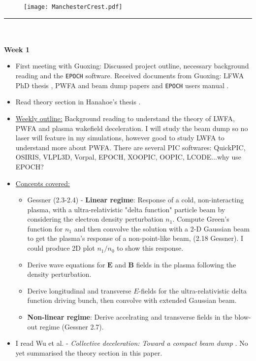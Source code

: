 \documentclass[%
onecolumn, notitlepage,
 amsmath,amssymb,
 aps,
]{article}
\renewcommand{\vec}[1]{\mathbf{#1}}
\renewcommand{\vec}[1]{\mathbf{#1}}
\begin{document}
\begin{figure}[h]
\vspace{-95pt}\hspace{0.85\textwidth}
\texttt{[image: ManchesterCrest.pdf]} 
\end{figure}\vspace{-35pt}
\noindent\rule{0.72\textwidth}{0.4pt}\\
\\
\noindent \textbf{Week 1}
\begin{itemize}
\item[\textcolor{MancPurple}{\textbullet}]  First meeting with Guoxing: Discussed project outline, necessary background reading and the \texttt{EPOCH} software. Received documents from Guoxing: LFWA PhD thesis \citep{Chou2016}, PWFA and beam dump papers \citep{Bonatto2015,Bonatto2016,Lu2005,Wu2010,Chou2016a,Hanahoe2017} and  \texttt{EPOCH} users manual \citep{Bennett2015}.
\item[\textcolor{MancPurple}{\textbullet}] Read theory section in Hanahoe's thesis \citep{Hanahoe2017}.
\item[\textcolor{MancPurple}{\textbullet}] \underline{Weekly outline:} Background reading to understand the theory of LWFA, PWFA and plasma wakefield deceleration. I will study the beam dump so no laser will feature in my simulations, however good to study LWFA to understand more about PWFA. There are several PIC softwares: QuickPIC, OSIRIS, VLPL3D, Vorpal, EPOCH, XOOPIC, OOPIC, LCODE...why use EPOCH?
\item[\textcolor{MancPurple}{\textbullet}] \underline{Concepts covered:}
 \begin{itemize}
\item[\textcolor{MancPurple}{\textopenbullet}] Gessner (2.3-2.4) - \textbf{Linear regime}: Response of a cold, non-interacting plasma, with a ultra-relativistic "delta function" particle beam by considering the electron density perturbation $n_1$. Compute Green's function for $n_1$ and then convolve the solution with a 2-D Gaussian beam to get the plasma's response of a non-point-like beam, (2.18 Gessner). I could produce 2D plot $n_1/n_0$ to show this response.
\item[\textcolor{MancPurple}{\textopenbullet}] Derive wave equations for $\vec{E}$ and $\vec{B}$ fields in the plasma following the density perturbation.
\item[\textcolor{MancPurple}{\textopenbullet}] Derive longitudinal and transverse $E$-fields for the ultra-relativistic delta function driving bunch, then convolve with extended Gaussian beam.
\item[\textcolor{MancPurple}{\textopenbullet}] \textbf{Non-linear regime}: Derive accelrating and transverse fields in the blow-out regime (Gessner 2.7).
\end{itemize}
\item[\textcolor{MancPurple}{\textbullet}] I read Wu et al.  - \textit{Collective deceleration: Toward a compact beam dump}\citep{Wu2010} . No yet summarised the theory section in this paper.



\end{itemize}
\end{document}
